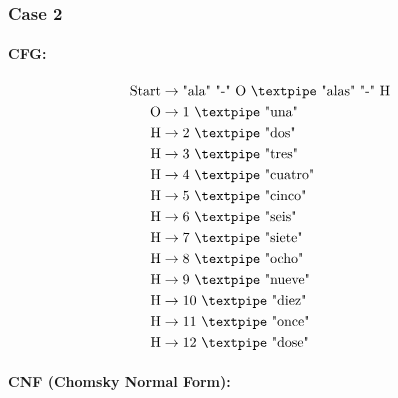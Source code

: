 \subsubsection{Case 2}

\paragraph{CFG:}

\begin{equation*}
    \begin{aligned}
        \text{Start}   & \rightarrow \text{"ala" "-" O {\textpipe} "alas" "-" H}   \\
        \text{O} & \rightarrow \text{1 {\textpipe} "una"}   \\
        \text{H} & \rightarrow \text{2 {\textpipe} "dos"} \\
        \text{H} & \rightarrow \text{3 {\textpipe} "tres"} \\
        \text{H} & \rightarrow \text{4 {\textpipe} "cuatro"} \\
        \text{H} & \rightarrow \text{5 {\textpipe} "cinco"} \\
        \text{H} & \rightarrow \text{6 {\textpipe} "seis"} \\
        \text{H} & \rightarrow \text{7 {\textpipe} "siete"} \\
        \text{H} & \rightarrow \text{8 {\textpipe} "ocho"} \\
        \text{H} & \rightarrow \text{9 {\textpipe} "nueve"} \\
        \text{H} & \rightarrow \text{10 {\textpipe} "diez"} \\
        \text{H} & \rightarrow \text{11 {\textpipe} "once"} \\
        \text{H} & \rightarrow \text{12 {\textpipe} "dose"} \\
    \end{aligned}
\end{equation*}

\paragraph{CNF (Chomsky Normal Form):}

